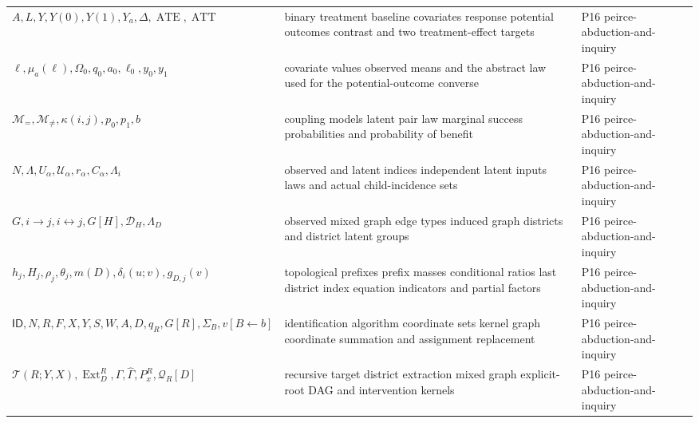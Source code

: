 \begin{longtable}{@{}p{}p{}p{}@{}}
\(A,\allowbreak L,\allowbreak Y,\allowbreak Y(0),\allowbreak Y(1),\allowbreak Y_a,\allowbreak \Delta,\allowbreak \operatorname{ATE},\allowbreak \operatorname{ATT}\) & binary treatment baseline covariates response potential outcomes contrast and two treatment-effect targets & P16 peirce-\allowbreak{}abduction-\allowbreak{}and-\allowbreak{}inquiry \\
\(\ell,\allowbreak \mu_a(\ell),\allowbreak \Omega_0,\allowbreak q_0,\allowbreak a_0,\allowbreak \ell_0,\allowbreak y_0,\allowbreak y_1\) & covariate values observed means and the abstract law used for the potential-outcome converse & P16 peirce-\allowbreak{}abduction-\allowbreak{}and-\allowbreak{}inquiry \\
\(\mathcal M_=,\allowbreak \mathcal M_{\ne},\allowbreak \kappa(i,\allowbreak j),\allowbreak p_0,\allowbreak p_1,\allowbreak b\) & coupling models latent pair law marginal success probabilities and probability of benefit & P16 peirce-\allowbreak{}abduction-\allowbreak{}and-\allowbreak{}inquiry \\
\(N,\allowbreak \Lambda,\allowbreak U_\alpha,\allowbreak \mathcal U_\alpha,\allowbreak r_\alpha,\allowbreak C_\alpha,\allowbreak \Lambda_i\) & observed and latent indices independent latent inputs laws and actual child-incidence sets & P16 peirce-\allowbreak{}abduction-\allowbreak{}and-\allowbreak{}inquiry \\
\(G,\allowbreak i\to j,\allowbreak i\leftrightarrow j,\allowbreak G[H],\allowbreak \mathcal D_H,\allowbreak \Lambda_D\) & observed mixed graph edge types induced graph districts and district latent groups & P16 peirce-\allowbreak{}abduction-\allowbreak{}and-\allowbreak{}inquiry \\
\(h_j,\allowbreak H_j,\allowbreak \rho_j,\allowbreak \theta_j,\allowbreak m(D),\allowbreak \delta_i(u;\allowbreak v),\allowbreak g_{D,j}(v)\) & topological prefixes prefix masses conditional ratios last district index equation indicators and partial factors & P16 peirce-\allowbreak{}abduction-\allowbreak{}and-\allowbreak{}inquiry \\
\(\mathsf{ID},\allowbreak N,\allowbreak R,\allowbreak F,\allowbreak X,\allowbreak Y,\allowbreak S,\allowbreak W,\allowbreak A,\allowbreak D,\allowbreak q_R,\allowbreak G[R],\allowbreak \Sigma_B,\allowbreak v[B\leftarrow b]\) & identification algorithm coordinate sets kernel graph coordinate summation and assignment replacement & P16 peirce-\allowbreak{}abduction-\allowbreak{}and-\allowbreak{}inquiry \\
\(\mathcal T(R;\allowbreak Y,\allowbreak X),\allowbreak \operatorname{Ext}^R_D,\allowbreak \Gamma,\allowbreak \widehat\Gamma,\allowbreak P^R_x,\allowbreak \mathcal Q_R[D]\) & recursive target district extraction mixed graph explicit-root DAG and intervention kernels & P16 peirce-\allowbreak{}abduction-\allowbreak{}and-\allowbreak{}inquiry \\

\end{longtable}
